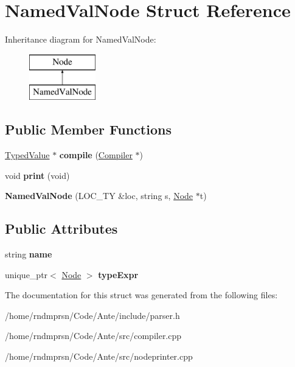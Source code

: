 \hypertarget{structNamedValNode}{}\section{Named\+Val\+Node Struct Reference}
\label{structNamedValNode}
Inheritance diagram for Named\+Val\+Node\+:\begin{figure}[H]
\begin{center}
\leavevmode
\includegraphics[height=2.000000cm]{structNamedValNode}
\end{center}
\end{figure}
\subsection*{Public Member Functions}
\begin{DoxyCompactItemize}
\item 
\mbox{\label{structNamedValNode_af1b2db9c2c7eb236826971834adf7270}} 
\hyperlink{structTypedValue}{Typed\+Value} $\ast$ {\bfseries compile} (\hyperlink{structante_1_1Compiler}{Compiler} $\ast$)
\item 
\mbox{\label{structNamedValNode_a86acd4eba0a34caa7962ed08c93cdd15}} 
void {\bfseries print} (void)
\item 
\mbox{\label{structNamedValNode_a9ca223230e0ef18113ab1e3d7be390bb}} 
{\bfseries Named\+Val\+Node} (L\+O\+C\+\_\+\+TY \&loc, string s, \hyperlink{structNode}{Node} $\ast$t)
\end{DoxyCompactItemize}
\subsection*{Public Attributes}
\begin{DoxyCompactItemize}
\item 
\mbox{\label{structNamedValNode_aed31c4c9d8f4e4ff11d5a1645e69ae65}} 
string {\bfseries name}
\item 
\mbox{\label{structNamedValNode_aa2a4eadc5ec05a1e6e019010e556b1d3}} 
unique\+\_\+ptr$<$ \hyperlink{structNode}{Node} $>$ {\bfseries type\+Expr}
\end{DoxyCompactItemize}


The documentation for this struct was generated from the following files\+:\begin{DoxyCompactItemize}
\item 
/home/rndmprsn/\+Code/\+Ante/include/parser.\+h\item 
/home/rndmprsn/\+Code/\+Ante/src/compiler.\+cpp\item 
/home/rndmprsn/\+Code/\+Ante/src/nodeprinter.\+cpp\end{DoxyCompactItemize}
